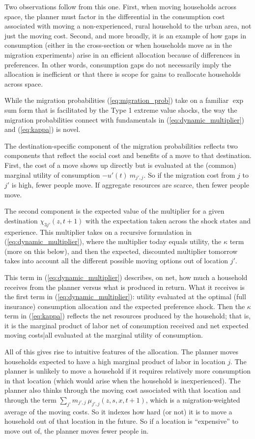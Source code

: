 \documentclass[12pt,pdftex]{article}
\begin{document}
Two observations follow from this one. First, when moving households across space, the planner must factor in the differential in the consumption cost associated with moving a non-experienced, rural household to the urban area, not just the moving cost. Second, and more broadly, it is an example of how gaps in consumption (either in the cross-section or when households move as in the migration experiments) arise in an efficient allocation because of differences in preferences. In other words, consumption gaps do not necessarily imply the allocation is inefficient or that there is scope for gains to reallocate households across space.

While the migration probabilities (\ref{eq:migration_prob}) take on a familiar $\exp$ sum form that is facilitated by the Type 1 extreme value shocks, the way the migration probabilities connect with fundamentals in (\ref{eq:dynamic_multiplier}) and (\ref{eq:kappa}) is novel.

The destination-specific component of the migration probabilities reflects two components that reflect the social cost and benefits of a move to that destination. First, the cost of a move shows up directly but is evaluated at the (common) marginal utility of consumption $-u'(t) \ m_{j',j}$. So if the migration cost from $j$ to $j'$ is high, fewer people move. If aggregate resources are scarce, then fewer people move.

The second component is the expected value of the multiplier for a given destination $\chi_{3j'}(z, t+1)$ with the expectation taken across the shock states and experience. This multiplier takes on a recursive formulation in (\ref{eq:dynamic_multiplier}), where the multiplier today equals utility, the $\kappa$ term (more on this below), and then the expected, discounted multiplier tomorrow takes into account all the different possible moving options out of location $j'$.

This term in (\ref{eq:dynamic_multiplier}) describes, on net, how much a household receives from the planner versus what is produced in return. What it receives is the first term in (\ref{eq:dynamic_multiplier}): utility evaluated at the optimal (full insurance) consumption allocation and the expected preference shock. Then the $\kappa$ term in (\ref{eq:kappa}) reflects the net resources produced by the household; that is, it is the marginal product of labor net of consumption received and net expected moving costs|all evaluated at the marginal utility of consumption.

All of this gives rise to intuitive features of the allocation. The planner moves households expected to have a high marginal product of labor in location $j$. The planner is unlikely to move a household if it requires relatively more consumption in that location (which would arise when the household is inexperienced). The planner also thinks through the moving cost associated with that location and through the term $\sum_{j'}  m_{j',j} \ \mu_{j',j}(z, s, x, t+1)$, which is a migration-weighted average of the moving costs. So it indexes how hard (or not) it is to move a household out of that location in the future. So if a location is ``expensive'' to move out of, the planner moves fewer people in.
\end{document}
